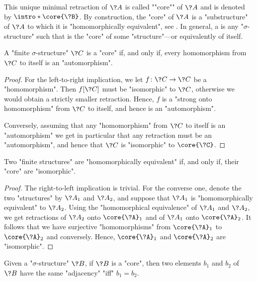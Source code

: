 This unique minimal retraction of $\?A$ is called \AP""core"" of $\?A$ and
is denoted by \AP$\intro*\core{\?B}$.
By construction, the "core" of $\?A$ is a "substructure" of $\?A$ to which it is "homomorphically equivalent", see .
In general, a  is any "$\sigma$-structure" such that is the "core" of
some "structure"---or equivalently of itself.

\begin{proposition}
	\AP\label{prop:core-iff-hom-are-auto}
	A "finite $\sigma$-structure" $\?C$ is a "core" if, and only if, every
	homomorphism from $\?C$ to itself is an "automorphism".
\end{proposition}

\begin{proof}
	For the left-to-right implication,
	we let $f\colon \?C \to \?C$ be a "homomorphism".
	Then $f[\?C]$ must be "isomorphic" to $\?C$, otherwise we would obtain
	a strictly smaller retraction. Hence, $f$ is a "strong onto homomorphism"
	from $\?C$ to itself, and hence is an "automorphism".
	
	Conversely, assuming that any "homomorphism" from $\?C$ to itself is an "automorphism"
	we get in particular that any retraction must be an "automorphism", and
	hence that $\?C$ is "isomorphic" to $\core{\?C}$.
\end{proof}

\begin{proposition}
	Two "finite structures" are "homomorphically equivalent" if,
	and only if, their "core" are "isomorphic".
\end{proposition}

\begin{proof}
	The right-to-left implication is trivial.
	For the converse one, denote the two "structures" by $\?A_1$ and $\?A_2$,
	and suppose that $\?A_1$ is "homomorphically equivalent" to $\?A_2$.
	Using the "homomorphical equivalence" of $\?A_1$ and $\?A_2$,
	we get retractions of $\?A_2$ onto $\core{\?A}_1$ and of $\?A_1$ onto $\core{\?A}_2$.
	It follows that we have surjective "homomorphisms" from $\core{\?A}_1$ to $\core{\?A}_2$
	and conversely. Hence, $\core{\?A}_1$ and $\core{\?A}_2$ are "isomorphic".
\end{proof}

\begin{proposition}
	\AP\label{prop:adjacency-core}
	Given a "$\sigma$-structure" $\?B$, if $\?B$ is a "core", then
	two elements $b_1$ and $b_2$ of $\?B$ have the same "adjacency" "iff" $b_1 = b_2$.
\end{proposition}

